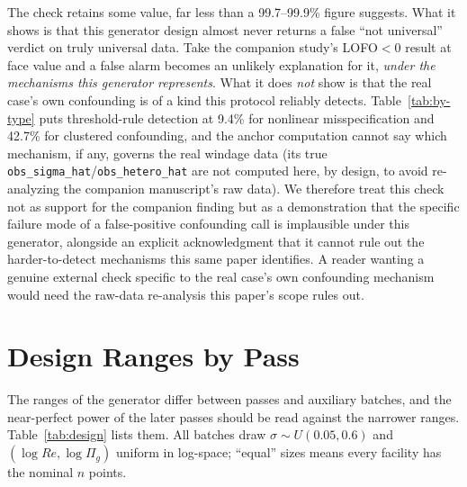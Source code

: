 \documentclass[journal=dce]{CUP-JNL-DTM}%
\begin{document}
\begin{appendix}
The check retains some value, far less than a 99.7--99.9\% figure suggests. What it shows is that this generator design almost never returns a false ``not universal'' verdict on truly universal data. Take the companion study's LOFO$<0$ result at face value and a false alarm becomes an unlikely explanation for it, \emph{under the mechanisms this generator represents}. What it does \emph{not} show is that the real case's own confounding is of a kind this protocol reliably detects. Table~\ref{tab:by-type} puts threshold-rule detection at 9.4\% for nonlinear misspecification and 42.7\% for clustered confounding, and the anchor computation cannot say which mechanism, if any, governs the real windage data (its true \texttt{obs\_sigma\_hat}/\texttt{obs\_hetero\_hat} are not computed here, by design, to avoid re-analyzing the companion manuscript's raw data). We therefore treat this check not as support for the companion finding but as a demonstration that the specific failure mode of a false-positive confounding call is implausible under this generator, alongside an explicit acknowledgment that it cannot rule out the harder-to-detect mechanisms this same paper identifies. A reader wanting a genuine external check specific to the real case's own confounding mechanism would need the raw-data re-analysis this paper's scope rules out.



\section{Design Ranges by Pass}
\label{app:design}
The ranges of the generator differ between passes and auxiliary batches, and the near-perfect power of the later passes should be read against the narrower ranges. Table~\ref{tab:design} lists them. All batches draw $\sigma\sim U(0.05,0.6)$ and $(\log Re,\log\Pi_g)$ uniform in log-space; ``equal'' sizes means every facility has the nominal $n$ points.


\end{appendix}
\end{document}
